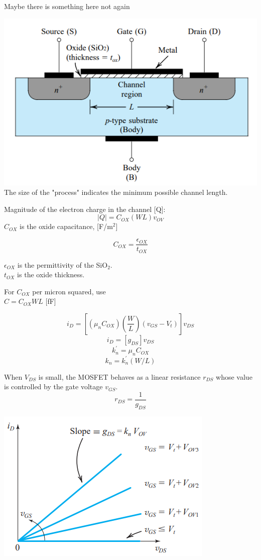 \documentclass[a4paper]{article}
\begin{document}
\begin{multicols}{3}
\raggedright
\fontsize{6pt}{0.3pt}\selectfont
\setlength{\abovedisplayskip}{2pt}
\setlength{\belowdisplayskip}{0pt}

Maybe there is something here 
not again

\includegraphics[width=\linewidth]{imgs/nmos}
The size of the "process" indicates the minimum
possible channel length. 

Magnitude of the electron charge in the channel [Q]:$$|Q|=C_{OX}(WL)v_{OV}$$
$C_{OX}$ is the oxide capacitance, [F/m$^2$]

$$C_{OX}=\frac{\epsilon_{OX}}{t_{OX}}$$

$\epsilon_{OX}$ is the permittivity of the SiO$_2$.\\
$t_{OX}$ is the oxide thickness.

For $C_{OX}$ per micron squared, use \\
$C=C_{OX}WL$ [fF]

$$i_D=\left[ (\mu_nC_{OX})\left(\frac{W}{L}\right)(v_{GS}-V_t)\right]v_{DS}$$
$$i_D=\left[ g_{DS} \right]v_{DS}$$
$$k_n^{'}=\mu_nC_{OX}$$
$$k_n=k_n^{'}(W/L)$$

When $V_{DS}$ is small, the MOSFET behaves as a linear 
resistance $r_{DS}$ whose value is controlled by the gate 
voltage $v_{GS}$.
$$r_{DS}=\frac{1}{g_{DS}}$$

\includegraphics[width=\linewidth]{imgs/nmos_as_r}


\end{multicols}
\end{document}
